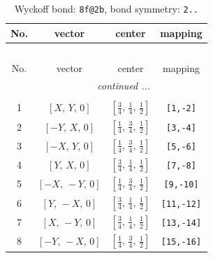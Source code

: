 \documentclass[fleqn,8pt]{jsarticle}
\begin{document}
\begin{longtable}{cccc}
\caption{Wyckoff bond: {\tt 8f@2b}, bond symmetry: {\tt 2..}}
 \\
 \hline \hline
No. & vector & center & mapping \\ \hline \endfirsthead

\multicolumn{3}{l}{\tablename\ \thetable{}} \\
 \hline \hline
No. & vector & center & mapping \\ \hline \endhead

 \hline \hline
\multicolumn{3}{r}{\footnotesize\it continued ...} \\ \endfoot

 \hline \hline
\multicolumn{3}{r}{} \\ \endlastfoot

1 & $\left[ X,\, Y,\, 0 \right]$ & $\left[ \frac{3}{4},\, \frac{1}{4},\, \frac{1}{2} \right]$ & {\tt [1,-2]} \\ \hline
2 & $\left[ - Y,\, X,\, 0 \right]$ & $\left[ \frac{1}{4},\, \frac{3}{4},\, \frac{1}{2} \right]$ & {\tt [3,-4]} \\ \hline
3 & $\left[ - X,\, Y,\, 0 \right]$ & $\left[ \frac{1}{4},\, \frac{3}{4},\, \frac{1}{2} \right]$ & {\tt [5,-6]} \\ \hline
4 & $\left[ Y,\, X,\, 0 \right]$ & $\left[ \frac{3}{4},\, \frac{1}{4},\, \frac{1}{2} \right]$ & {\tt [7,-8]} \\ \hline
5 & $\left[ - X,\, - Y,\, 0 \right]$ & $\left[ \frac{1}{4},\, \frac{3}{4},\, \frac{1}{2} \right]$ & {\tt [9,-10]} \\ \hline
6 & $\left[ Y,\, - X,\, 0 \right]$ & $\left[ \frac{3}{4},\, \frac{1}{4},\, \frac{1}{2} \right]$ & {\tt [11,-12]} \\ \hline
7 & $\left[ X,\, - Y,\, 0 \right]$ & $\left[ \frac{3}{4},\, \frac{1}{4},\, \frac{1}{2} \right]$ & {\tt [13,-14]} \\ \hline
8 & $\left[ - Y,\, - X,\, 0 \right]$ & $\left[ \frac{1}{4},\, \frac{3}{4},\, \frac{1}{2} \right]$ & {\tt [15,-16]} \\
\end{longtable}
\renewcommand{\arraystretch}{1.2}
\end{document}
